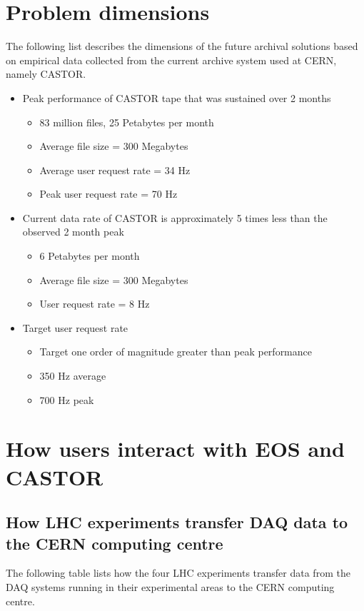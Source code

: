 \documentclass{article}
\begin{document}
\section{Problem dimensions}
The following list describes the dimensions of the future archival solutions based on empirical data collected from the current archive system used at CERN, namely CASTOR.
\begin{itemize}
	\item Peak performance of CASTOR tape that was sustained over 2 months
	\begin{itemize}
		\item 83 million files, 25 Petabytes per month
		\item Average file size = 300 Megabytes
		\item Average user request rate = 34 Hz
		\item Peak user request rate = 70 Hz
	\end{itemize}

	\item Current data rate of CASTOR is approximately 5 times less than the observed 2 month peak
	\begin{itemize}
		\item 6 Petabytes per month
		\item Average file size = 300 Megabytes
		\item User request rate = 8 Hz
	\end{itemize}

	\item Target user request rate
	\begin{itemize}
		\item Target one order of magnitude greater than peak performance
		\item 350 Hz average
		\item 700 Hz peak
	\end{itemize}
\end{itemize}

\section{How users interact with EOS and CASTOR}
\subsection{How LHC experiments transfer DAQ data to the CERN computing centre}
The following table lists how the four LHC experiments transfer data from the DAQ systems running in their experimental areas to the CERN computing centre.
\end{document}
